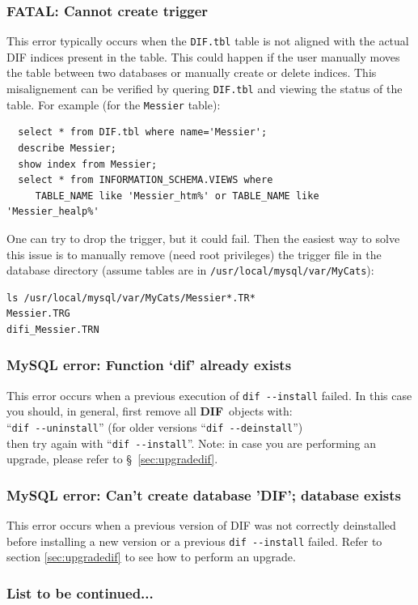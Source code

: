 \documentclass[10pt,titlepage]{article}
\newcommand{\dif}{\textbf{\small DIF}}
\begin{document}
\subsubsection{FATAL: Cannot create trigger}
This error typically occurs when the \verb|DIF.tbl| table is not aligned with
the actual DIF indices present in the table. This could happen if the user
manually moves the table between two databases or manually create or delete
indices. This misalignement can be verified by quering \verb|DIF.tbl| and
viewing the status of the table. For example (for the \verb|Messier| table): \\
\begin{verbatim}
  select * from DIF.tbl where name='Messier';
  describe Messier;
  show index from Messier;
  select * from INFORMATION_SCHEMA.VIEWS where
     TABLE_NAME like 'Messier_htm%' or TABLE_NAME like 'Messier_healp%'
\end{verbatim}

One can try to drop the trigger, but it could fail. Then the easiest way
to solve this issue is to manually remove (need root privileges) the trigger file in the database
directory (assume tables are in \verb|/usr/local/mysql/var/MyCats|):

\begin{verbatim}
ls /usr/local/mysql/var/MyCats/Messier*.TR*
Messier.TRG
difi_Messier.TRN
\end{verbatim}

%
\subsubsection{MySQL error: Function `dif' already exists}
This error occurs when a previous execution of \verb|dif --install| failed. In
this case you should, in general, first remove all \dif\ objects with:
\\
``\verb|dif --uninstall|'' (for older versions ``\verb|dif --deinstall|'')
\\
then try again with ``\verb|dif --install|''.
Note: in case you are performing an upgrade, please refer to
\S\ \ref{sec:upgradedif}.

%
\subsubsection{MySQL error: Can't create database 'DIF'; database exists}
This error occurs when a previous version of DIF was not correctly deinstalled
before installing a new version or a previous \verb|dif --install| failed.
Refer to section \ref{sec:upgradedif}
to see how to perform an upgrade.

%
\subsubsection{List to be continued...}
\end{document}
